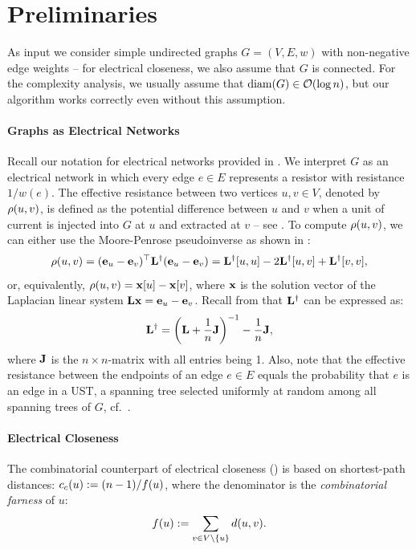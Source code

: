 \section{Preliminaries}
\label{sec:el-clos:prelim}

As input we consider simple undirected graphs $G = (V, E, w)$ with
non-negative edge weights -- for electrical closeness, we also assume that $G$ is connected.
For the complexity analysis, we usually assume that $\text{diam}(G) \in \mathcal{O}(\log n)$, but our
algorithm works correctly even without this assumption.

\paragraph{Graphs as Electrical Networks}
Recall our notation for electrical networks provided in
. We interpret $G$ as an electrical
network in which every edge $e\in E$ represents a resistor with resistance
$1/w(e)$.
The effective resistance between two vertices $u,v\in V$, denoted by $\rho(u, v)$,
is defined as the potential difference between $u$ and $v$ when a unit of current
is injected into $G$ at $u$ and extracted at $v$ -- see .
To compute $\rho(u, v)$, we can either use the Moore-Penrose pseudoinverse as shown
in :
%
\begin{equation}
\label{eq:el-clos:eff-res}
\rho(u, v) = (\mathbf{e}_{u} - \mathbf{e}_{v})^\top\mathbf{L}^\dagger(\mathbf{e}_{u} - \mathbf{e}_{v}) =
\mathbf{L}^\dagger[u,u] - 2\mathbf{L}^\dagger[u,v] + \mathbf{L}^\dagger[v,v],
\end{equation}
%
or, equivalently, $\rho(u, v) = \mathbf{x}[u] - \mathbf{x}[v]$, where $\mathbf{x}$
is the solution vector of the Laplacian linear system $\mathbf{L}\mathbf{x} =
\mathbf{e}_{u} - \mathbf{e}_{v}$.
Recall from  that $\mathbf{L}^\dagger$ can be expressed as:
%
\[
\Linv = \roundb{\Lapl + \frac1n \Ones}^{-1} - \frac1n \Ones,
\]
%
where $\mathbf{J}$ is the $n\times n$-matrix with all entries being 1.
Also, note that the effective resistance between the endpoints of an edge $e\in E$
equals the probability that $e$ is an edge in a UST, \ie a spanning tree selected
uniformly at random among all spanning trees of $G$, cf.~\cite[Ch. II]{DBLP:books/daglib/0009415}.

\paragraph{Electrical Closeness}
The combinatorial counterpart of electrical closeness ()
is based on shortest-path distances: $c_c(u) := (n - 1) / f(u)$, where the
denominator is the \emph{combinatorial farness} of $u$:
%
\begin{equation}
\label{eq:comb-farness}
    \farn(u) := \sum_{v \in V \setminus \set{u}} d(u, v).
\end{equation}

